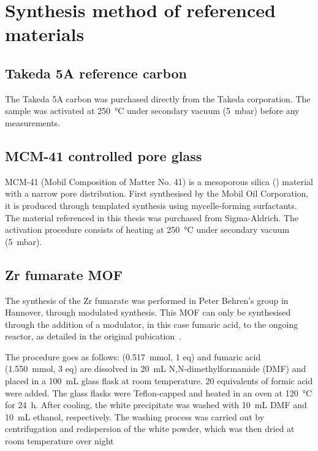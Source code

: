 
\graphicspath{ {\thisappx/figures/} }

\chapter{Synthesis method of referenced materials}%
\label{appx:synthesis}

\section{Takeda 5A reference carbon}%
\label{appx:synthesis:takeda}

The Takeda 5A carbon was purchased directly from the Takeda corporation.
The sample was activated at \SI{250}{\celsius} under 
secondary vacuum (\SI{5}{\milli\bar}) before any measurements.

\section{MCM-41 controlled pore glass}%
\label{appx:synthesis:mcm41}

MCM-41 (Mobil Composition of Matter No. 41) is a mesoporous silica 
() material with a narrow pore distribution. First synthesised 
by the Mobil Oil Corporation, it is produced through templated 
synthesis using mycelle-forming surfactants.
The material referenced in this thesis was purchased from Sigma-Aldrich.
The activation procedure consists of heating at \SI{250}{\celsius} under 
secondary vacuum (\SI{5}{\milli\bar}).

\section{Zr fumarate MOF}%
\label{appx:synthesis:zrformate}

The synthesis of the Zr fumarate was performed in Peter Behren's 
group in Hannover, through modulated synthesis. This MOF can only
be synthesised through the addition of a modulator, in this case
fumaric acid, to the ongoing reactor, as detailed in the 
original pubication~\cite{wissmannModulatedSynthesisZrfumarate2012}.

The procedure goes as follows: 
(\SI{0.517}{\milli\mol}, 1 eq) and fumaric acid 
(\SI{1.550}{\milli\mol}, 3 eq) are dissolved 
in \SI{20}{\milli\liter} N,N-dimethylformamide (DMF) 
and placed in a \SI{100}{\milli\liter} glass flask at room 
temperature. 20 equivalents of formic acid were added.
The glass flasks were Teflon-capped and heated in an oven at
\SI{120}{\degreeCelsius} for \SI{24}{\hour}. After cooling, 
the white precipitate was washed with \SI{10}{\milli\liter} 
DMF and \SI{10}{\milli\liter} ethanol, respectively. 
The washing process was carried out by centrifugation and 
redispersion of the white powder, which was then
dried at room temperature over night



